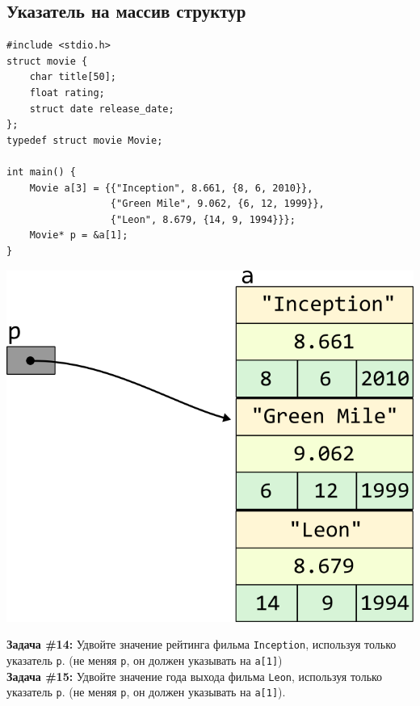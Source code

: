 \documentclass{article}
\begin{document}
\subsection*{Указатель на массив структур}
\begin{lstlisting}
#include <stdio.h>
struct movie {
	char title[50];
	float rating;
	struct date release_date;
};
typedef struct movie Movie;

int main() {
	Movie a[3] = {{"Inception", 8.661, {8, 6, 2010}}, 
	              {"Green Mile", 9.062, {6, 12, 1999}}, 
	              {"Leon", 8.679, {14, 9, 1994}}};
	Movie* p = &a[1];
}
\end{lstlisting}

\vspace{-59ex}
\begin{center}
\quad\quad\quad\quad\quad\quad\quad\quad\quad\quad\quad\quad\quad\quad\quad\quad\quad\quad\quad\quad\quad\quad\quad
\includegraphics[scale=1]{../images/pointer_schemes/pointer_to_array_of_struct_movie.png}
\end{center}
\textbf{Задача \#14:} Удвойте значение рейтинга фильма \texttt{Inception}, используя только указатель \texttt{p}. (не меняя \texttt{p}, он должен указывать на \texttt{a[1]})\\
\textbf{Задача \#15:} Удвойте значение года выхода фильма \texttt{Leon}, используя только указатель \texttt{p}. (не меняя \texttt{p}, он должен указывать на \texttt{a[1]}).\\
\end{document}
